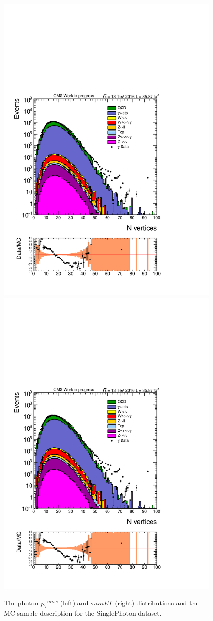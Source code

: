 \begin{figure}[htbp!]
\centering
\includegraphics[width=0.48\linewidth, page=6]{figures/ReMiniAODSummer16HLT_FixXsec_SepProc_PhPtWt_tight_puWeightsummer16_unblind_log_.pdf}
\includegraphics[width=0.48\linewidth, page=9]{figures/ReMiniAODSummer16HLT_FixXsec_SepProc_PhPtWt_tight_puWeightsummer16_unblind_log_.pdf}
\caption{The photon ${p_{T}}^{miss}$ (left) and $sumET$ (right) distributions and the MC sample description for the SinglePhoton dataset. }
\label{fig:pho_met}
\end{figure}

